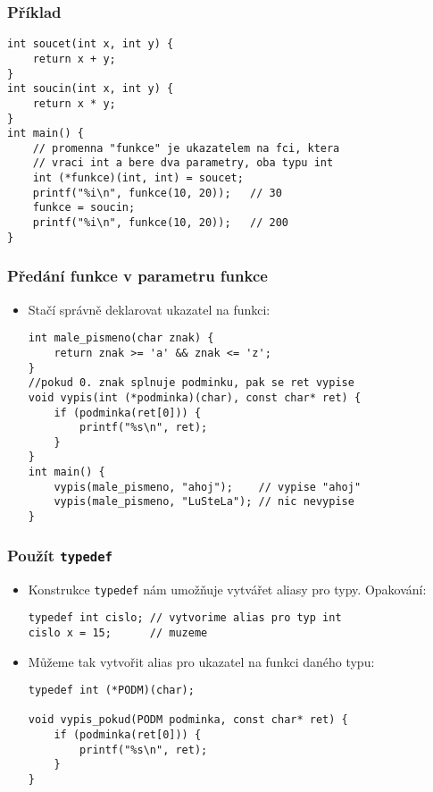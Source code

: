 \documentclass{beamer}
\newenvironment{itemizex}%
  {\large \begin{itemize}%
    \setlength{\itemsep}{8pt}%
    \setlength{\parskip}{8pt}}%
  {\end{itemize}}
\newenvironment{itemizey}%
  {\large \begin{itemize}%
    \setlength{\itemsep}{6pt}%
    \setlength{\parskip}{6pt}}%
  {\end{itemize}}
\begin{document}
\begin{frame}[t,fragile]\frametitle{Příklad} 
\begin{verbatim} 
int soucet(int x, int y) {
    return x + y;
}
int soucin(int x, int y) {
    return x * y;
}
int main() {
    // promenna "funkce" je ukazatelem na fci, ktera 
    // vraci int a bere dva parametry, oba typu int
    int (*funkce)(int, int) = soucet;
    printf("%i\n", funkce(10, 20));   // 30
    funkce = soucin;
    printf("%i\n", funkce(10, 20));   // 200
}
\end{verbatim}
\end{frame}


\begin{frame}[t,fragile]\frametitle{Předání funkce v parametru funkce} 
    \begin{itemizex}
        \item Stačí správně deklarovat ukazatel na funkci: 
\begin{verbatim} 
int male_pismeno(char znak) {
    return znak >= 'a' && znak <= 'z';
}
//pokud 0. znak splnuje podminku, pak se ret vypise
void vypis(int (*podminka)(char), const char* ret) {
    if (podminka(ret[0])) {
        printf("%s\n", ret);
    }
}
int main() {
    vypis(male_pismeno, "ahoj");    // vypise "ahoj"
    vypis(male_pismeno, "LuSteLa"); // nic nevypise
}
\end{verbatim}
    \end{itemizex}
\end{frame}


\begin{frame}[t,fragile]\frametitle{Použít \texttt{typedef}} 
    \begin{itemizey}
        \item Konstrukce \texttt{typedef} nám umožňuje vytvářet aliasy pro typy. Opakování:
\begin{verbatim} 
typedef int cislo; // vytvorime alias pro typ int
cislo x = 15;      // muzeme 
\end{verbatim}
        \item Můžeme tak vytvořit alias pro ukazatel na funkci daného typu:
\begin{verbatim} 
typedef int (*PODM)(char);

void vypis_pokud(PODM podminka, const char* ret) {
    if (podminka(ret[0])) {
        printf("%s\n", ret);
    }
}
\end{verbatim}
    \end{itemizey}
\end{frame}
\end{document}
